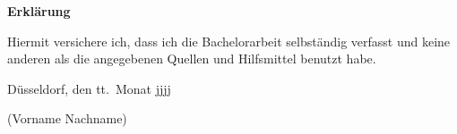 \documentclass[12pt,titlepage,a4paper]{article}
\begin{document}
\pagebreak\noindent
\textbf{\LARGE Erkl\"arung}

\bigskip\bigskip
\noindent 
Hiermit versichere ich, dass ich die   Bachelorarbeit selbst\"andig verfasst und keine
anderen als die angegebenen Quellen und Hilfsmittel benutzt habe.

\bigskip
\noindent
D\"usseldorf, den tt.\ Monat jjjj

\bigskip\bigskip\bigskip
\noindent
(Vorname Nachname)
\end{document}

